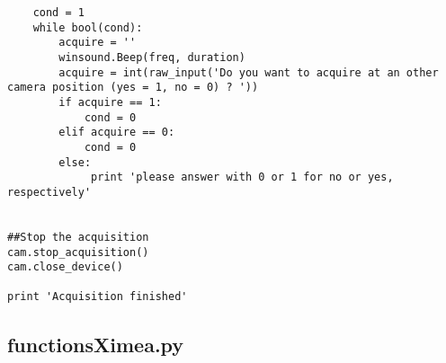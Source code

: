 \begin{lstlisting}
    cond = 1
    while bool(cond):
        acquire = ''
        winsound.Beep(freq, duration)
        acquire = int(raw_input('Do you want to acquire at an other camera position (yes = 1, no = 0) ? '))
        if acquire == 1:
            cond = 0
        elif acquire == 0:
            cond = 0
        else:
             print 'please answer with 0 or 1 for no or yes, respectively'


##Stop the acquisition
cam.stop_acquisition()
cam.close_device()

print 'Acquisition finished'

\end{lstlisting}

\subsection{functionsXimea.py}
\label{subapp:functionsXimea}

